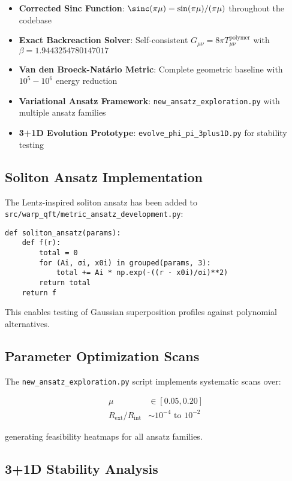 \documentclass[12pt,a4paper]{article}
\begin{document}
\begin{itemize}
\item \textbf{Corrected Sinc Function}: $\sinc(\pi\mu) = \sin(\pi\mu)/(\pi\mu)$ throughout the codebase
\item \textbf{Exact Backreaction Solver}: Self-consistent $G_{\mu\nu} = 8\pi T_{\mu\nu}^{\text{polymer}}$ with $\beta = 1.9443254780147017$
\item \textbf{Van den Broeck-Natário Metric}: Complete geometric baseline with $10^5-10^6$ energy reduction
\item \textbf{Variational Ansatz Framework}: \texttt{new\_ansatz\_exploration.py} with multiple ansatz families
\item \textbf{3+1D Evolution Prototype}: \texttt{evolve\_phi\_pi\_3plus1D.py} for stability testing
\end{itemize}

\subsection{Soliton Ansatz Implementation}

The Lentz-inspired soliton ansatz has been added to \texttt{src/warp\_qft/metric\_ansatz\_development.py}:

\begin{verbatim}
def soliton_ansatz(params):
    def f(r):
        total = 0
        for (Ai, σi, x0i) in grouped(params, 3):
            total += Ai * np.exp(-((r - x0i)/σi)**2)
        return total
    return f
\end{verbatim}

This enables testing of Gaussian superposition profiles against polynomial alternatives.

\subsection{Parameter Optimization Scans}

The \texttt{new\_ansatz\_exploration.py} script implements systematic scans over:

\begin{align}
\mu &\in [0.05, 0.20] \\
R_{\text{ext}}/R_{\text{int}} &\sim 10^{-4} \text{ to } 10^{-2}
\end{align}

generating feasibility heatmaps for all ansatz families.

\subsection{3+1D Stability Analysis}
\end{document}
